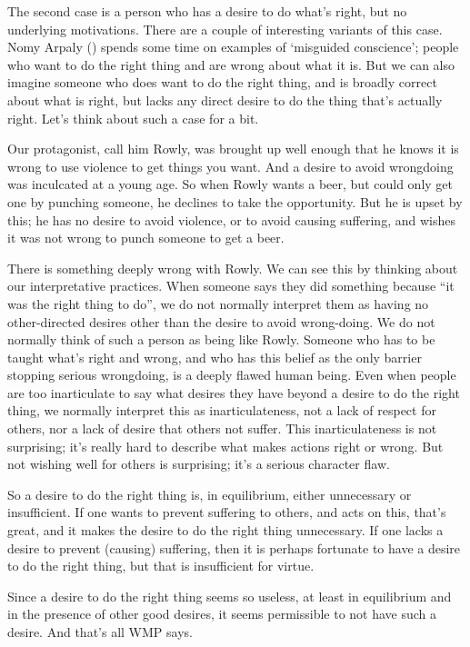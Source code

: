 \documentclass[
  10pt,
  letterpaper,
  twoside]{scrbook}
\begin{document}
The second case is a person who has a desire to do what's right, but no
underlying motivations. There are a couple of interesting variants of
this case. Nomy Arpaly () spends some
time on examples of `misguided conscience'; people who want to do the
right thing and are wrong about what it is. But we can also imagine
someone who does want to do the right thing, and is broadly correct
about what is right, but lacks any direct desire to do the thing that's
actually right. Let's think about such a case for a bit.

Our protagonist, call him {Rowly}, was brought up well enough that he
knows it is wrong to use violence to get things you want. And a desire
to avoid wrongdoing was inculcated at a young age. So when {Rowly} wants
a beer, but could only get one by punching someone, he declines to take
the opportunity. But he is upset by this; he has no desire to avoid
violence, or to avoid causing suffering, and wishes it was not wrong to
punch someone to get a beer.

There is something deeply wrong with {Rowly}. We can see this by
thinking about our interpretative practices. When someone says they did
something because ``it was the right thing to do'', we do not normally
interpret them as having no other-directed desires other than the desire
to avoid wrong-doing. We do not normally think of such a person as being
like {Rowly}. Someone who has to be taught what's right and wrong, and
who has this belief as the only barrier stopping serious wrongdoing, is
a deeply flawed human being. Even when people are too inarticulate to
say what desires they have beyond a desire to do the right thing, we
normally interpret this as inarticulateness, not a lack of respect for
others, nor a lack of desire that others not suffer. This
inarticulateness is not surprising; it's really hard to describe what
makes actions right or wrong. But not wishing well for others is
surprising; it's a serious character flaw.

So a desire to do the right thing is, in equilibrium, either unnecessary
or insufficient. If one wants to prevent suffering to others, and acts
on this, that's great, and it makes the desire to do the right thing
unnecessary. If one lacks a desire to prevent (causing) suffering, then
it is perhaps fortunate to have a desire to do the right thing, but that
is insufficient for virtue.

Since a desire to do the right thing seems so useless, at least in
equilibrium and in the presence of other good desires, it seems
permissible to not have such a desire. And that's all WMP says.
\end{document}
